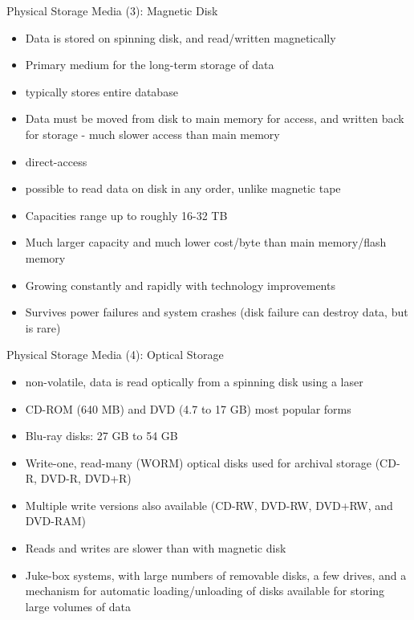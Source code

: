\documentclass[aspectratio=169, xcolor=dvipsnames]{beamer}
\begin{document}
\begin{frame}{Physical Storage Media (3): Magnetic Disk}
    \begin{block}{}
        \begin{itemize}[<+->]
            \item Data is stored on spinning disk, and read/written magnetically
            \item Primary medium for the long-term storage of data
            \item typically stores entire database
            \item Data must be moved from disk to main memory for access, and written back for storage - much slower access than main memory
            \item direct-access
            \item possible to read data on disk in any order, unlike magnetic tape
            \item Capacities range up to roughly 16-32 TB
            \item Much larger capacity and much lower cost/byte than main memory/flash memory
            \item Growing constantly and rapidly with technology improvements
            \item Survives power failures and system crashes (disk failure can destroy data, but is rare)
        \end{itemize}
    \end{block}
\end{frame}

\begin{frame}{Physical Storage Media (4): Optical Storage}
    \begin{block}{}
        \begin{itemize}[<+->]
            \item non-volatile, data is read optically from a spinning disk using a laser
            \item CD-ROM (640 MB) and DVD (4.7 to 17 GB) most popular forms
            \item Blu-ray disks: 27 GB to 54 GB
            \item Write-one, read-many (WORM) optical disks used for archival storage (CD-R, DVD-R, DVD+R)
            \item Multiple write versions also available (CD-RW, DVD-RW, DVD+RW, and DVD-RAM)
            \item Reads and writes are slower than with magnetic disk
            \item Juke-box systems, with large numbers of removable disks, a few drives, and a mechanism for automatic loading/unloading of disks available for storing large volumes of data
        \end{itemize}
    \end{block}
\end{frame}
\end{document}
